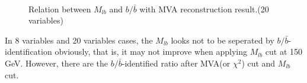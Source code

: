 		\begin{figure}[H]
		\centering
			\\
		\caption{Relation between $M_{lb}$ and $b/\bar{b}$ with MVA reconstruction result.(20 variables)}
		\label{EventSelReco:fig:a05_bbsep_eff}
		\end{figure}
		\FloatBarrier

		In 8 variables and 20 variables cases, the $M_{lb}$ looks not to be seperated by $b/\bar{b}$-identification obviously, that is, it may not improve when applying $M_{lb}$ cut at 150 GeV. However, there are the $b/\bar{b}$-identified ratio after MVA(or $\chi^2$) cut and $M_{lb}$ cut.


